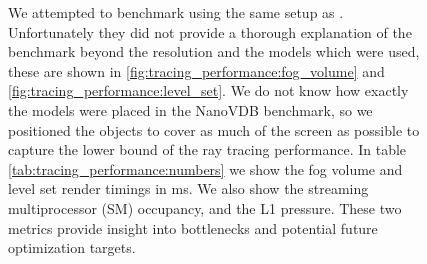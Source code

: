 \begin{figure}[H]
    \hfill
    \vspace{0.5cm}
    \hfill
    \caption{We attempted to benchmark using the same setup as \cite{NanoVDBBenchmark}. Unfortunately they did not provide a thorough explanation of the benchmark beyond the resolution and the models which were used, these are shown in \ref{fig:tracing_performance:fog_volume} and \ref{fig:tracing_performance:level_set}. We do not know how exactly the models were placed in the NanoVDB benchmark, so we positioned the objects to cover as much of the screen as possible to capture the lower bound of the ray tracing performance. In table \ref{tab:tracing_performance:numbers} we show the fog volume and level set render timings in ms. We also show the streaming multiprocessor (SM) occupancy, and the L1 pressure. These two metrics provide insight into bottlenecks and potential future optimization targets.}
\end{figure}